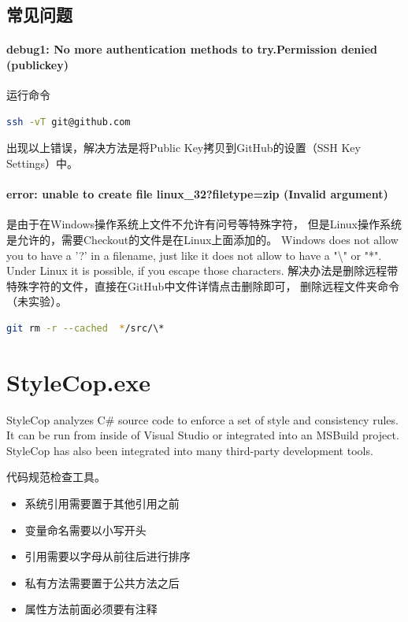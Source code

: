 \documentclass{book}
\begin{document}
\subsection{常见问题}

\paragraph{debug1: No more authentication methods to try.Permission denied (publickey)}运行命令

\begin{lstlisting}[language=Bash]
ssh -vT git@github.com
\end{lstlisting}

出现以上错误，解决方法是将Public Key拷贝到GitHub的设置（SSH Key Settings）中。

\paragraph{error: unable to create file linux\_32?filetype=zip (Invalid argument)}
是由于在Windows操作系统上文件不允许有问号等特殊字符，
但是Linux操作系统是允许的，需要Checkout的文件是在Linux上面添加的。
Windows does not allow you to have a '?' in a filename, 
just like it does not allow to have a "\textbackslash" or "*". 
Under Linux it is possible, if you escape those characters. 
解决办法是删除远程带特殊字符的文件，直接在GitHub中文件详情点击删除即可，
删除远程文件夹命令（未实验）。

\begin{lstlisting}[language=Bash]
git rm -r --cached  */src/\* 
\end{lstlisting}

\section{StyleCop.exe}

StyleCop analyzes C\# source code to enforce a set of style and consistency rules. It can be run from inside of Visual Studio or integrated into an MSBuild project. StyleCop has also been integrated into many third-party development tools.

代码规范检查工具。

\begin{itemize}
\item{系统引用需要置于其他引用之前}
\item{变量命名需要以小写开头}
\item{引用需要以字母从前往后进行排序}
\item{私有方法需要置于公共方法之后}
\item{属性方法前面必须要有注释}
\end{itemize}
\end{document}
